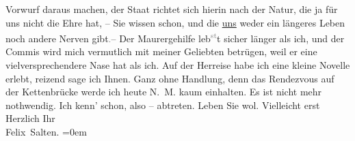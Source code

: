 \begin{ledgroupsized}[t]{13cm}
               Vorwurf daraus machen, der Staat richtet {\pb}sich hierin nach der
               Natur, die ja für uns nicht die Ehre hat, – Sie wissen schon, und die \uline{uns} weder ein längeres Leben noch andere Nerven
                  gibt\textcolor{gray}{.}– Der Maurergehilfe leb\substVorne{}\textsuperscript{\textcolor{gray}{st}}\substDazwischen{}t\substHinten{} sicher länger als ich, und der Commis wird mich vermutlich mit meiner
               Geliebten betrügen, weil er eine vielversprechendere Nase hat als ich.\pend
           \pstart
           Auf der Herreise habe ich eine kleine Novelle erlebt, reizend sage {\pb}ich Ihnen. Ganz ohne Handlung,
               denn das Rendezvous auf der Kettenbrücke werde
               ich heute N. M. kaum einhalten. Es ist nicht mehr nothwendig. Ich kenn’
                  \label{K_L03108-2v}\label{K_L03108-2h} schon, also –
               abtreten.\pend
           \pstart
           Leben Sie wol. Vielleicht erst \label{K_L03108-3v}\label{K_L03108-3h}\pend
           \pstart
           Herzlich Ihr {\\[\baselineskip]}\spacefill\mbox{Felix Salten.}\pend
           \leftskip=0em{}
         
         \endnumbering{}\end{ledgroupsized}  \newcommand{\dateiname}{L03108}\newcommand{\titel}{Felix Salten an Arthur Schnitzler, [31. 3. 1892]}\newcommand{\editorInnen}{Martin Anton Müller und Laura Untner}
      